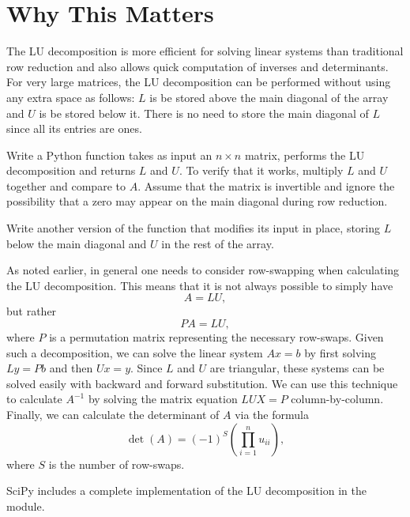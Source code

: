 \section*{Why This Matters}
The LU decomposition is more efficient for solving linear systems than traditional row reduction and also allows quick computation of inverses and determinants. 
For very large matrices, the LU decomposition can be performed without using any extra space as follows:
$L$ is be stored above the main diagonal of the array and $U$ is be stored below it.
There is no need to store the main diagonal of $L$ since all its entries are ones.

\begin{problem}
\label{prob:LU}
Write a Python function takes as input an $n\times n$ matrix, performs the LU decomposition and returns $L$ and $U$.
To verify that it works, multiply $L$ and $U$ together and compare to $A$.
Assume that the matrix is invertible and ignore the possibility that a zero may appear on the main diagonal during row reduction.

Write another version of the function that modifies its input in place, storing $L$ below the main diagonal and $U$ in the rest of the array.
\end{problem}

As noted earlier, in general one needs to consider row-swapping when 
calculating the LU decomposition. This means that it is not always possible 
to simply have 
\[
A = LU,
\] 
but rather 
\[
PA = LU,
\]
where $P$ is a permutation matrix representing the necessary row-swaps. Given such a decomposition, we can solve the linear system $Ax = b$ by 
first solving $Ly = Pb$ and then $Ux = y$. Since $L$ and $U$ are triangular, 
these systems can be solved easily with backward and forward substitution. 
We can use this technique to calculate $A^{-1}$ by solving the matrix 
equation $LUX = P$ column-by-column. Finally, we can calculate the 
determinant of $A$ via the formula
\[
\det(A) = (-1)^S\left(\displaystyle\prod_{i=1}^nu_{ii}\right),
\]
where $S$ is the number of row-swaps. 

SciPy includes a complete implementation of the LU decomposition in the  module. 

